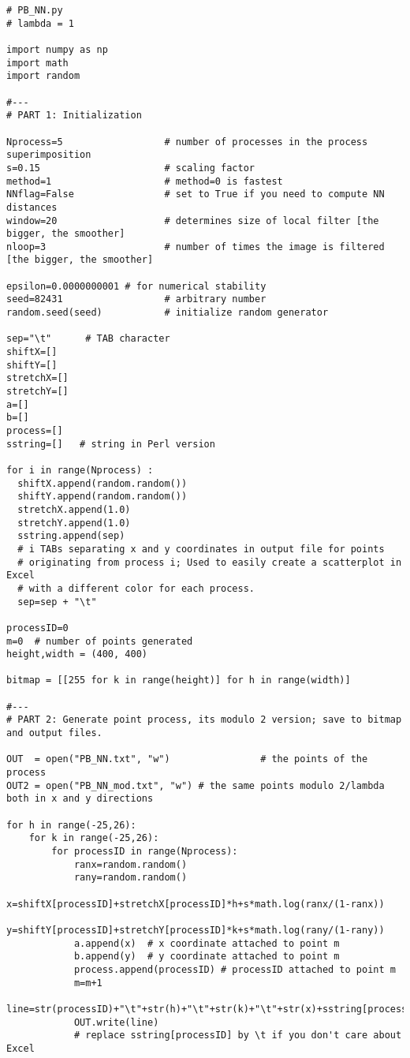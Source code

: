 \documentclass[oneside,10pt]{book}
\begin{document}
\begin{lstlisting}
# PB_NN.py
# lambda = 1

import numpy as np
import math
import random

#---
# PART 1: Initialization

Nprocess=5                  # number of processes in the process superimposition
s=0.15                      # scaling factor
method=1                    # method=0 is fastest
NNflag=False                # set to True if you need to compute NN distances
window=20                   # determines size of local filter [the bigger, the smoother]
nloop=3                     # number of times the image is filtered [the bigger, the smoother]

epsilon=0.0000000001 # for numerical stability
seed=82431                  # arbitrary number
random.seed(seed)           # initialize random generator

sep="\t"      # TAB character
shiftX=[]
shiftY=[]
stretchX=[]
stretchY=[]
a=[]
b=[]
process=[]
sstring=[]   # string in Perl version

for i in range(Nprocess) :
  shiftX.append(random.random())
  shiftY.append(random.random())
  stretchX.append(1.0)
  stretchY.append(1.0)
  sstring.append(sep)
  # i TABs separating x and y coordinates in output file for points
  # originating from process i; Used to easily create a scatterplot in Excel
  # with a different color for each process.
  sep=sep + "\t"

processID=0
m=0  # number of points generated
height,width = (400, 400)

bitmap = [[255 for k in range(height)] for h in range(width)]

#---
# PART 2: Generate point process, its modulo 2 version; save to bitmap and output files.

OUT  = open("PB_NN.txt", "w")                # the points of the process
OUT2 = open("PB_NN_mod.txt", "w") # the same points modulo 2/lambda both in x and y directions

for h in range(-25,26):
    for k in range(-25,26):
        for processID in range(Nprocess):
            ranx=random.random()
            rany=random.random()
            x=shiftX[processID]+stretchX[processID]*h+s*math.log(ranx/(1-ranx))
            y=shiftY[processID]+stretchY[processID]*k+s*math.log(rany/(1-rany))
            a.append(x)  # x coordinate attached to point m
            b.append(y)  # y coordinate attached to point m
            process.append(processID) # processID attached to point m
            m=m+1
            line=str(processID)+"\t"+str(h)+"\t"+str(k)+"\t"+str(x)+sstring[processID]+str(y)+"\n"
            OUT.write(line)
            # replace sstring[processID] by \t if you don't care about Excel


\end{lstlisting}
\end{document}
